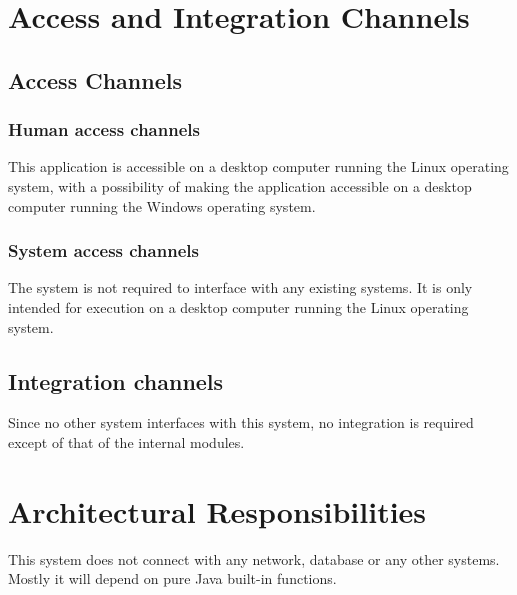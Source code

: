 
\section{Access and Integration Channels}
\subsection{Access Channels}
\subsubsection{Human access channels}

This application is accessible on a desktop computer running the Linux operating system, with a possibility of making the application accessible on a desktop computer running the Windows operating system.

\subsubsection{System access channels}
The system is not required to interface with any existing systems. It is only intended for execution on a desktop computer running the Linux operating system.

\subsection{Integration channels}
Since no other system interfaces with this system, no integration is required except of that of the internal modules.

\section{Architectural Responsibilities}

This system does not connect with any network, database or any other systems. Mostly it will depend on pure Java built-in functions.

